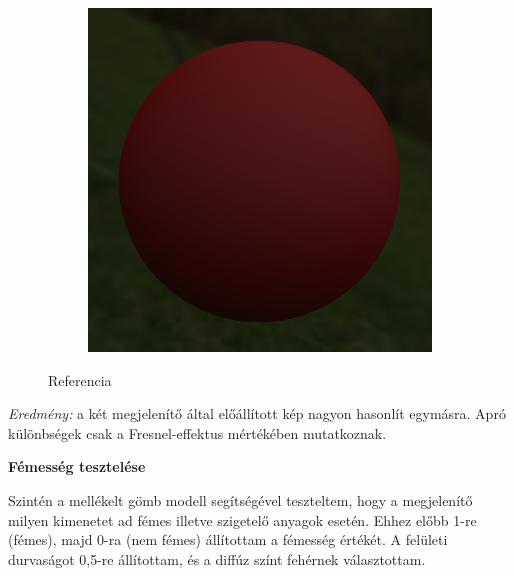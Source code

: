 \begin{figure}[!ht]
\begin{subfigure}[b]{0.28\textwidth}
    \end{subfigure}
    \hfill
    \begin{subfigure}[b]{0.28\textwidth}
        \centering
        \includegraphics[width=\textwidth]{images/marmoset_r0.png}
    \end{subfigure}
    \caption{Referencia}
\end{figure}

\textit{Eredmény:} a két megjelenítő által előállított kép nagyon hasonlít egymásra. Apró különbségek csak a Fresnel-effektus mértékében mutatkoznak.

\vspace{15pt}

\noindent
\textbf{Fémesség tesztelése}

Szintén a mellékelt gömb modell segítségével teszteltem, hogy a megjelenítő milyen kimenetet ad fémes illetve szigetelő anyagok esetén. Ehhez előbb 1-re (fémes), majd 0-ra (nem fémes) állítottam a fémesség értékét. A felületi durvaságot 0,5-re állítottam, és a diffúz színt fehérnek választottam.

